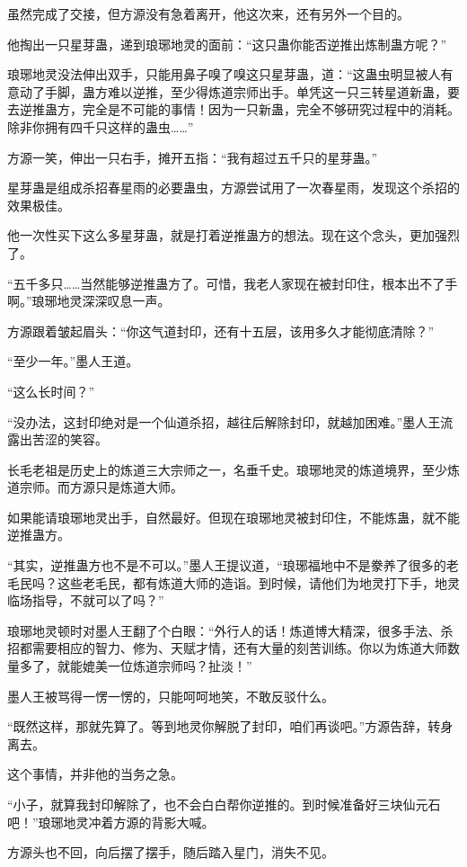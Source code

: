 \begin{this_body}
虽然完成了交接，但方源没有急着离开，他这次来，还有另外一个目的。

他掏出一只星芽蛊，递到琅琊地灵的面前：“这只蛊你能否逆推出炼制蛊方呢？”

琅琊地灵没法伸出双手，只能用鼻子嗅了嗅这只星芽蛊，道：“这蛊虫明显被人有意动了手脚，蛊方难以逆推，至少得炼道宗师出手。单凭这一只三转星道新蛊，要去逆推蛊方，完全是不可能的事情！因为一只新蛊，完全不够研究过程中的消耗。除非你拥有四千只这样的蛊虫……”

方源一笑，伸出一只右手，摊开五指：“我有超过五千只的星芽蛊。”

星芽蛊是组成杀招春星雨的必要蛊虫，方源尝试用了一次春星雨，发现这个杀招的效果极佳。

他一次性买下这么多星芽蛊，就是打着逆推蛊方的想法。现在这个念头，更加强烈了。

“五千多只……当然能够逆推蛊方了。可惜，我老人家现在被封印住，根本出不了手啊。”琅琊地灵深深叹息一声。

方源跟着皱起眉头：“你这气道封印，还有十五层，该用多久才能彻底清除？”

“至少一年。”墨人王道。

“这么长时间？”

“没办法，这封印绝对是一个仙道杀招，越往后解除封印，就越加困难。”墨人王流露出苦涩的笑容。

长毛老祖是历史上的炼道三大宗师之一，名垂千史。琅琊地灵的炼道境界，至少炼道宗师。而方源只是炼道大师。

如果能请琅琊地灵出手，自然最好。但现在琅琊地灵被封印住，不能炼蛊，就不能逆推蛊方。

“其实，逆推蛊方也不是不可以。”墨人王提议道，“琅琊福地中不是豢养了很多的老毛民吗？这些老毛民，都有炼道大师的造诣。到时候，请他们为地灵打下手，地灵临场指导，不就可以了吗？”

琅琊地灵顿时对墨人王翻了个白眼：“外行人的话！炼道博大精深，很多手法、杀招都需要相应的智力、修为、天赋才情，还有大量的刻苦训练。你以为炼道大师数量多了，就能媲美一位炼道宗师吗？扯淡！”

墨人王被骂得一愣一愣的，只能呵呵地笑，不敢反驳什么。

“既然这样，那就先算了。等到地灵你解脱了封印，咱们再谈吧。”方源告辞，转身离去。

这个事情，并非他的当务之急。

“小子，就算我封印解除了，也不会白白帮你逆推的。到时候准备好三块仙元石吧！”琅琊地灵冲着方源的背影大喊。

方源头也不回，向后摆了摆手，随后踏入星门，消失不见。


\end{this_body}
